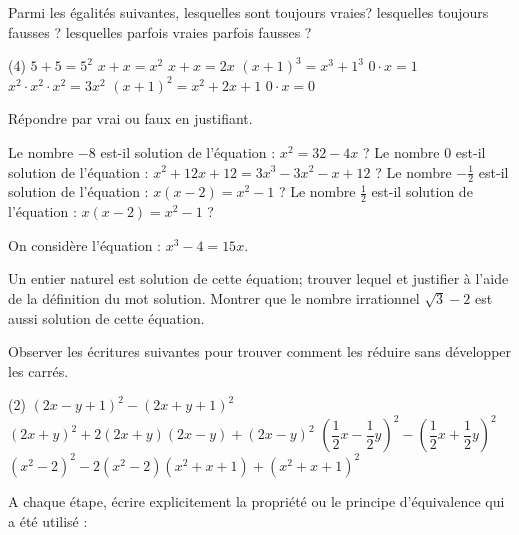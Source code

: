 \documentclass[a4paper,12pt]{report}
\begin{document}
\vspace*{-2\baselineskip}
\begin{acti}
Parmi les égalités suivantes, lesquelles sont toujours vraies? lesquelles toujours fausses ? lesquelles parfois vraies parfois fausses ?
	\begin{tasks}(4)
\task $5+5=5^2$
\task $x+x=x^2$
\task $x+x=2 x$
\task $(x+1)^3=x^3+1^3$
\task $0 \cdot x=1$
\task $x^2 \cdot x^2 \cdot x^2=3 x^2$
\task $(x+1)^2=x^2+2 x+1$
\task $0 \cdot x=0$
	\end{tasks}
\end{acti}
\begin{acti}
	Répondre par vrai ou faux en justifiant.
\begin{tasks}
	\task  Le nombre $-8$ est-il solution de l'équation : $x^2=32-4 x$ ?
\task Le nombre $0$ est-il solution de l'équation : $x^2+12 x+12=3 x^3-3 x^2-x+12$ ?
\task Le nombre $-\frac{1}{2}$ est-il solution de l'équation : $x(x-2)=x^2-1$ ?
\task Le nombre $\frac{1}{2}$ est-il solution de l'équation : $x(x-2)=x^2-1$ ?
\end{tasks}
\end{acti}
\begin{acti}
On considère l'équation : $x^3-4=15 x$.
	\begin{tasks}
\task Un entier naturel est solution de cette équation; trouver lequel et justifier à l'aide de la définition du mot solution.
\task Montrer que le nombre irrationnel $\sqrt{3}-2$ est aussi solution de cette équation.
	\end{tasks}
\end{acti}
\begin{acti}
Observer les écritures suivantes pour trouver comment les réduire sans développer les carrés.
	\begin{tasks}(2)
\task $(2 x-y+1)^2-(2 x+y+1)^2$
\task $(2 x+y)^2+2(2 x+y)(2 x-y)+(2 x-y)^2$
\task $\left(\dfrac{1}{2} x-\dfrac{1}{2} y\right)^2-\left(\dfrac{1}{2} x+\dfrac{1}{2} y\right)^2$
\task $\left(x^2-2\right)^2-2\left(x^2-2\right)\left(x^2+x+1\right)+\left(x^2+x+1\right)^2$
	\end{tasks}
\end{acti}
\begin{acti}
A chaque étape, écrire explicitement la propriété ou le principe d'équivalence qui a été utilisé :
\end{acti}
\end{document}
